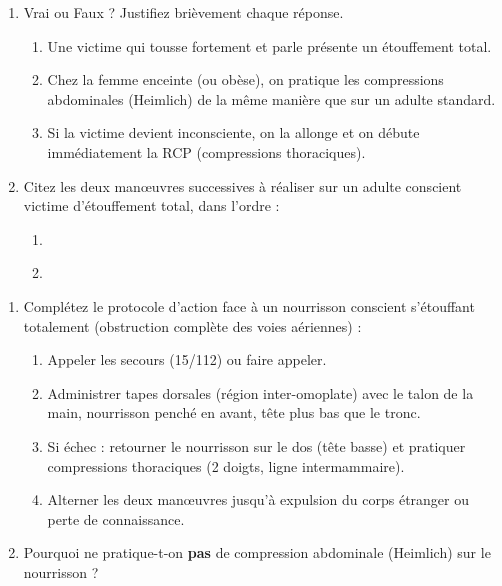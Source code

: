 \documentclass[11pt]{article}
\begin{document}
\begin{exercice}
\begin{enumerate}
    \item Vrai ou Faux ? Justifiez brièvement chaque réponse.
    \begin{enumerate}
        \item Une victime qui tousse fortement et parle présente un étouffement total. \hfill \underline{\hspace{8cm}}
        \item Chez la femme enceinte (ou obèse), on pratique les compressions abdominales (Heimlich) de la même manière que sur un adulte standard. \hfill \underline{\hspace{8cm}}
        \item Si la victime devient inconsciente, on la allonge et on débute immédiatement la RCP (compressions thoraciques). \hfill \underline{\hspace{8cm}}
    \end{enumerate}
    \item Citez les deux manœuvres successives à réaliser sur un adulte conscient victime d'étouffement total, dans l'ordre :
    \begin{enumerate}
        \item \underline{\hspace{6cm}}
        \item \underline{\hspace{6cm}}
    \end{enumerate}
\end{enumerate}
\end{exercice}

\begin{exercice}
\begin{enumerate}
    \item Complétez le protocole d'action face à un nourrisson conscient s'étouffant totalement (obstruction complète des voies aériennes) :
\begin{enumerate}
        \item Appeler les secours (15/112) ou faire appeler.
        \item Administrer \underline{\hspace{2cm}} tapes dorsales (région inter-omoplate) avec le talon de la main, nourrisson penché en avant, tête plus bas que le tronc.
        \item Si échec : retourner le nourrisson sur le dos (tête basse) et pratiquer \underline{\hspace{2cm}} compressions thoraciques (2 doigts, ligne intermammaire).
        \item Alterner les deux manœuvres jusqu'à expulsion du corps étranger ou perte de connaissance.
    \end{enumerate}
    \item Pourquoi ne pratique-t-on \textbf{pas} de compression abdominale (Heimlich) sur le nourrisson ?
    \underline{\hspace{10cm}}
\end{enumerate}
\end{exercice}
\end{document}
